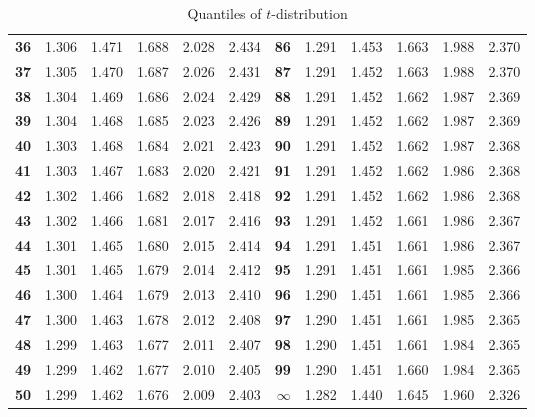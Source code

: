 \documentclass[captions=tableheading, 12pt, headings=small, parskip=half]{scrartcl}
\begin{document}
\begin{table}[ht]
{\begin{tabular}{>{\bfseries}rd{1.3}d{1.3}d{1.3}d{2.3}d{2.3}|>{\bfseries}rd{1.3}d{1.3}d{1.3}d{2.3}d{2.3}}
			36 & 1.306 & 1.471 & 1.688 & 2.028 & 2.434 & 86 & 1.291 & 1.453 & 1.663 & 1.988 & 2.370   \\ 
			37 & 1.305 & 1.470 & 1.687 & 2.026 & 2.431 & 87 & 1.291 & 1.452 & 1.663 & 1.988 & 2.370   \\ 
			38 & 1.304 & 1.469 & 1.686 & 2.024 & 2.429 & 88 & 1.291 & 1.452 & 1.662 & 1.987 & 2.369   \\ 
			39 & 1.304 & 1.468 & 1.685 & 2.023 & 2.426 & 89 & 1.291 & 1.452 & 1.662 & 1.987 & 2.369  \\ 
			40 & 1.303 & 1.468 & 1.684 & 2.021 & 2.423 & 90 & 1.291 & 1.452 & 1.662 & 1.987 & 2.368   \\ 
			41 & 1.303 & 1.467 & 1.683 & 2.020 & 2.421 & 91 & 1.291 & 1.452 & 1.662 & 1.986 & 2.368   \\ 
			42 & 1.302 & 1.466 & 1.682 & 2.018 & 2.418 & 92 & 1.291 & 1.452 & 1.662 & 1.986 & 2.368  \\ 
			43 & 1.302 & 1.466 & 1.681 & 2.017 & 2.416 & 93 & 1.291 & 1.452 & 1.661 & 1.986 & 2.367  \\ 
			44 & 1.301 & 1.465 & 1.680 & 2.015 & 2.414 & 94 & 1.291 & 1.451 & 1.661 & 1.986 & 2.367   \\ 
			45 & 1.301 & 1.465 & 1.679 & 2.014 & 2.412 & 95 & 1.291 & 1.451 & 1.661 & 1.985 & 2.366   \\ 
			46 & 1.300 & 1.464 & 1.679 & 2.013 & 2.410 & 96 & 1.290 & 1.451 & 1.661 & 1.985 & 2.366   \\ 
			47 & 1.300 & 1.463 & 1.678 & 2.012 & 2.408 & 97 & 1.290 & 1.451 & 1.661 & 1.985 & 2.365  \\ 
			48 & 1.299 & 1.463 & 1.677 & 2.011 & 2.407 & 98 & 1.290 & 1.451 & 1.661 & 1.984 & 2.365 \\ 
			49 & 1.299 & 1.462 & 1.677 & 2.010 & 2.405 & 99 & 1.290 & 1.451 & 1.660 & 1.984 & 2.365   \\ 
			50 & 1.299 & 1.462 & 1.676 & 2.009 & 2.403 & $\boldsymbol{\infty}$ & 1.282 & 1.440 & 1.645 & 1.960 & 2.326   \\ 
			\bottomrule
			\bottomrule
	\end{tabular}}
	\caption{Quantiles of $t$-distribution}
\end{table}
\end{document}

